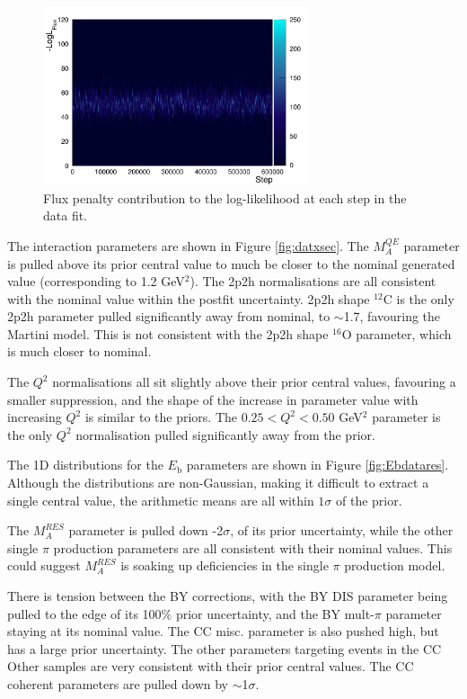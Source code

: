 \begin{figure}[!htbp]
\centering
\includegraphics*[width=0.7\textwidth,clip]{figs/llh_fluxdat}
\caption{Flux penalty contribution to the log-likelihood at each step in the data fit.}\label{fig:llh_fluxdat}
\end{figure}

The interaction parameters are shown in Figure \ref{fig:datxsec}. The $M^{QE}_A$ parameter is pulled above its prior central value to much be closer to the nominal generated value (corresponding to 1.2 GeV$^2$). The 2p2h normalisations are all consistent with the nominal value within the postfit uncertainty. 2p2h shape $^{12}$C is the only 2p2h parameter pulled significantly away from nominal, to $\sim$1.7, favouring the Martini model. This is not consistent with the 2p2h shape $^{16}$O parameter, which is much closer to nominal.

The $Q^2$ normalisations all sit slightly above their prior central values, favouring a smaller suppression, and the shape of the increase in parameter value with increasing $Q^2$ is similar to the priors. The $0.25 < Q^2< 0.50$ GeV$^2$ parameter is the only $Q^2$ normalisation pulled significantly away from the prior.

The 1D distributions for the $E_{\mathrm{b}}$ parameters are shown in Figure \ref{fig:Ebdatares}. Although the distributions are non-Gaussian, making it difficult to extract a single central value, the arithmetic means are all within $1\sigma$ of the prior.

The $M_A^{RES}$ parameter is pulled down -2$\sigma$, of its prior uncertainty, while the other single $\pi$ production parameters are all consistent with their nominal values. This could suggest $M_A^{RES}$ is soaking up deficiencies in the single $\pi$ production model.

There is tension between the BY corrections, with the BY DIS parameter being pulled to the edge of its 100$\%$ prior uncertainty, and the BY mult-$\pi$ parameter staying at its nominal value. The CC misc. parameter is also pushed high, but has a large prior uncertainty. The other parameters targeting events in the CC Other samples are very consistent with their prior central values. The CC coherent parameters are pulled down by $\sim$1$\sigma$.

